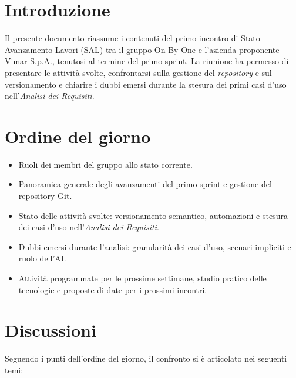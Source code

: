 \documentclass[11pt, a4paper]{article}
\begin{document}
\section{Introduzione}
Il presente documento riassume i contenuti del primo incontro di Stato Avanzamento Lavori (SAL) tra il gruppo On-By-One e l'azienda proponente Vimar S.p.A., tenutosi al termine del primo sprint. La riunione ha permesso di presentare le attività svolte, confrontarsi sulla gestione del \textit{repository} e sul versionamento e chiarire i dubbi emersi durante la stesura dei primi casi d'uso nell'\textit{Analisi dei Requisiti}.

\section{Ordine del giorno}
\begin{itemize}
    \item Ruoli dei membri del gruppo allo stato corrente.
    \item Panoramica generale degli avanzamenti del primo sprint e gestione del repository Git.
    \item Stato delle attività svolte: versionamento semantico, automazioni e stesura dei casi d'uso nell'\textit{Analisi dei Requisiti}.
    \item Dubbi emersi durante l'analisi: granularità dei casi d'uso, scenari impliciti e ruolo dell'AI.
    \item Attività programmate per le prossime settimane, studio pratico delle tecnologie e proposte di date per i prossimi incontri.
\end{itemize}

\section{Discussioni}
Seguendo i punti dell'ordine del giorno, il confronto si è articolato nei seguenti temi:
\end{document}
